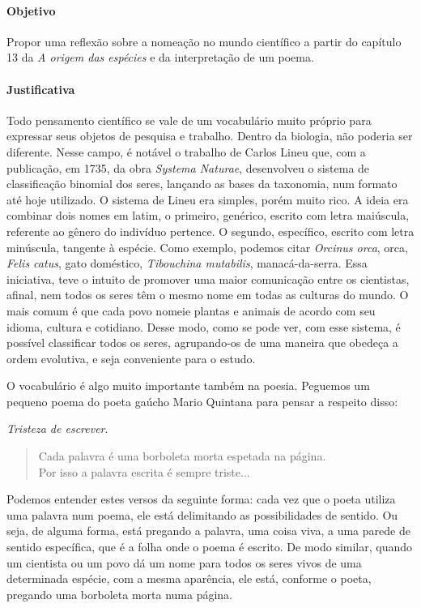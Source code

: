 \documentclass[11pt]{extarticle}
\begin{document}
\paragraph{Objetivo} Propor uma reflexão sobre a nomeação no mundo científico
a partir do capítulo 13 da \emph{A origem das espécies} e da interpretação de um poema. 

\paragraph{Justificativa} Todo pensamento científico se vale de um vocabulário muito próprio para
expressar seus objetos de pesquisa e trabalho. Dentro da biologia, não poderia
ser diferente. Nesse campo, é notável o trabalho de Carlos Lineu que, com
a publicação, em 1735, da obra \emph{Systema Naturae}, desenvolveu o sistema de
classificação binomial dos seres, lançando as bases da taxonomia, num formato
até hoje utilizado. O sistema de Lineu era simples, porém muito rico. A ideia
era combinar dois nomes em latim, o primeiro, genérico, escrito com letra
maiúscula, referente ao gênero do indivíduo pertence. O segundo, específico,
escrito com letra minúscula, tangente à espécie. Como exemplo, podemos citar
\emph{Orcinus orca}, orca, \emph{Felis catus}, gato doméstico, \emph{Tibouchina
mutabilis}, manacá-da-serra. Essa iniciativa, teve o intuito de promover uma
maior comunicação entre os cientistas, afinal, nem todos os seres têm o mesmo
nome em todas as culturas do mundo. O mais comum é que cada povo nomeie plantas
e animais de acordo com seu idioma, cultura e cotidiano. Desse modo, como se
pode ver, com esse sistema, é possível classificar todos os seres, agrupando-os
de uma maneira que obedeça a ordem evolutiva, e seja conveniente para o estudo.

O vocabulário é algo muito importante também na poesia. 
Peguemos um pequeno poema do poeta gaúcho Mario Quintana para pensar a respeito disso: 


\textit{Tristeza de escrever}.

\begin{verse}
Cada palavra é uma borboleta morta espetada na página.\\
Por isso a palavra escrita é sempre triste...
\end{verse}


Podemos entender estes versos da seguinte forma: cada vez que o poeta
utiliza uma palavra num poema, ele está delimitando as possibilidades
de sentido. Ou seja, de alguma forma, está pregando a palavra, uma coisa
viva, a uma parede de sentido específica, que é a folha onde o poema é 
escrito. De modo similar, quando um cientista ou um povo dá um nome para todos os 
seres vivos de uma determinada espécie, com a mesma aparência, ele está, conforme
o poeta, pregando uma borboleta morta numa página. 
\end{document}
